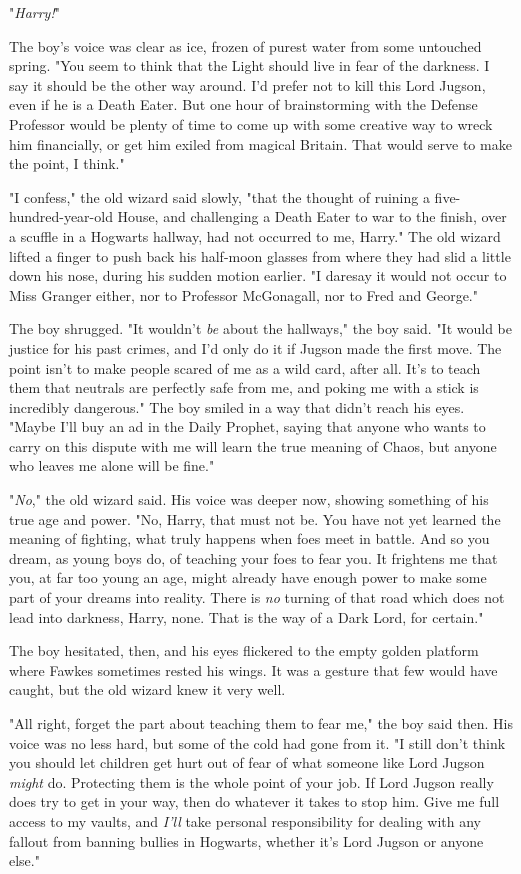 "\emph{Harry!}"

The boy's voice was clear as ice, frozen of purest water from some untouched
spring. "You seem to think that the Light should live in fear of the darkness.
I say it should be the other way around. I'd prefer not to kill this Lord
Jugson, even if he is a Death Eater. But one hour of brainstorming with the
Defense Professor would be plenty of time to come up with some creative way to
wreck him financially, or get him exiled from magical Britain. That would serve
to make the point, I think."

"I confess," the old wizard said slowly, "that the thought of ruining a
five-hundred-year-old House, and challenging a Death Eater to war to the
finish, over a scuffle in a Hogwarts hallway, had not occurred to me, Harry."
The old wizard lifted a finger to push back his half-moon glasses from where
they had slid a little down his nose, during his sudden motion earlier. "I
daresay it would not occur to Miss Granger either, nor to Professor McGonagall,
nor to Fred and George."

The boy shrugged. "It wouldn't \emph{be} about the hallways," the boy said. "It
would be justice for his past crimes, and I'd only do it if Jugson made the
first move. The point isn't to make people scared of me as a wild card, after
all. It's to teach them that neutrals are perfectly safe from me, and poking me
with a stick is incredibly dangerous." The boy smiled in a way that didn't
reach his eyes. "Maybe I'll buy an ad in the Daily Prophet, saying that anyone
who wants to carry on this dispute with me will learn the true meaning of
Chaos, but anyone who leaves me alone will be fine."

"\emph{No}," the old wizard said. His voice was deeper now, showing something
of his true age and power. "No, Harry, that must not be. You have not yet
learned the meaning of fighting, what truly happens when foes meet in battle.
And so you dream, as young boys do, of teaching your foes to fear you. It
frightens me that you, at far too young an age, might already have enough power
to make some part of your dreams into reality. There is \emph{no} turning of
that road which does not lead into darkness, Harry, none. That is the way of a
Dark Lord, for certain."

The boy hesitated, then, and his eyes flickered to the empty golden platform
where Fawkes sometimes rested his wings. It was a gesture that few would have
caught, but the old wizard knew it very well.

"All right, forget the part about teaching them to fear me," the boy said then.
His voice was no less hard, but some of the cold had gone from it. "I still
don't think you should let children get hurt out of fear of what someone like
Lord Jugson \emph{might} do. Protecting them is the whole point of your job. If
Lord Jugson really does try to get in your way, then do whatever it takes to
stop him. Give me full access to my vaults, and \emph{I'll} take personal
responsibility for dealing with any fallout from banning bullies in Hogwarts,
whether it's Lord Jugson or anyone else."

